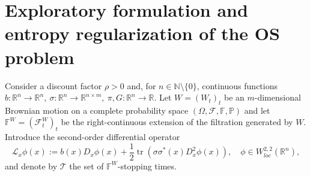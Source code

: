 \documentclass[11pt]{amsart}
\theoremstyle{plain}
\def \R{\mathbb{R}}
\DeclareMathOperator*{\tr}{tr}
\DeclareMathOperator*{\esssup}{ess\,sup}
\numberwithin{equation}{section}
\begin{document}

\section{Exploratory formulation and entropy regularization of the OS problem}\label{section 2}
Consider a discount factor $\rho>0$ and, for $n \in \mathbb N \setminus \{0\}$, continuous functions
$ b: \mathbb{R}^{n} \rightarrow \mathbb{R}^{n}, \ \sigma: \mathbb{R}^{n} \rightarrow \mathbb{R}^{n \times m}, \  \pi, G :\mathbb R ^n \to \mathbb R.$
Let  $W=(W_t)_t$ be an $m$-dimensional Brownian motion on a complete probability space $(\Omega, \mathcal F, \mathbb F, \mathbb P )$ and let $\mathbb F^W = (\mathcal F ^W_t)_{t}$ be the right-continuous extension of the filtration generated by $W$.  
Introduce the second-order differential operator
\begin{equation*}\label{eq operator}
    \mathcal L _x \phi (x) := b(x) D_x \phi (x) + \frac12 \tr( \sigma \sigma^* (x) D_x^2 \phi(x) ), \quad \phi \in W_{loc}^{2, 2} \left(\mathbb{R}^{n}\right), 
\end{equation*}
and denote by $\mathcal T$  the set of $\mathbb F^W$-stopping times. 
\end{document}
